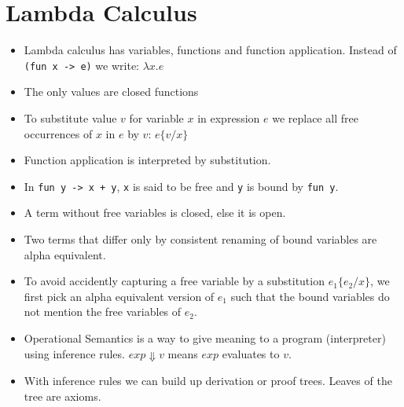 \section*{Lambda Calculus}

\begin{itemize}
	\item Lambda calculus has variables, functions and function application. Instead of \texttt{(fun x -> e)} we write: $\lambda x. e$
	
	\item The only values are closed functions
	
	\item To substitute value $v$ for variable $x$ in expression $e$ we replace all free occurrences of $x$ in $e$ by $v$: $e\{v / x\}$
	
	\item Function application is  interpreted by substitution.
	
	\item In \texttt{fun y -> x + y}, \texttt{x} is said to be free and \texttt{y} is bound by \texttt{fun y}.
	\item A term without free variables is closed, else it is open.
	
	\item Two terms that differ only by consistent renaming of bound variables are alpha equivalent.
	\item To avoid accidently capturing a free variable by a substitution $e_1 \{e_2 / x\}$, we first pick an alpha equivalent version of $e_1$ such that the bound variables do not mention the free variables of $e_2$.
	
	\item Operational Semantics is a way to give meaning to a program (interpreter) using inference rules. $exp \Downarrow v$ means $exp$ evaluates to $v$.

	\item With inference rules we can build up derivation or proof trees. Leaves of the tree are axioms.
\end{itemize}
